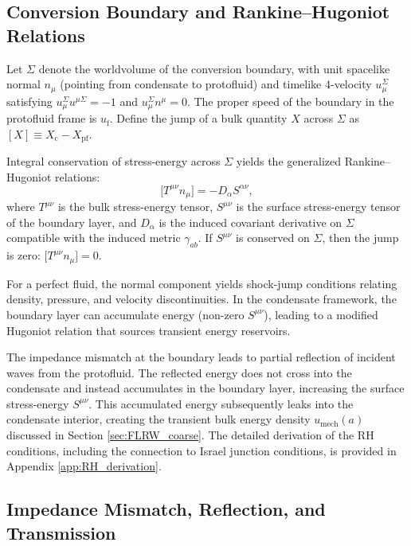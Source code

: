 \documentclass[11pt,a4paper]{article}
\newcommand{\umech}{u_{\mathrm{mech}}}
\newcommand{\uf}{u_{\mathrm{f}}}
\theoremstyle{definition}
\begin{document}
\subsection{Conversion Boundary and Rankine--Hugoniot Relations}
\label{sec:RH}

Let $\Sigma$ denote the worldvolume of the conversion boundary, with unit spacelike normal $n_\mu$ (pointing from condensate to protofluid) and timelike 4-velocity $u_\mu^{\Sigma}$ satisfying $u_\mu^{\Sigma} u^{\mu \Sigma} = -1$ and $u_\mu^{\Sigma} n^\mu = 0$. The proper speed of the boundary in the protofluid frame is $\uf$. Define the jump of a bulk quantity $X$ across $\Sigma$ as $[X] \equiv X_{\mathrm{c}} - X_{\mathrm{pf}}$.

Integral conservation of stress-energy across $\Sigma$ yields the generalized Rankine--Hugoniot relations:
\begin{equation}
\label{eq:RH_general}
\big[ T^{\mu\nu} n_\mu \big] = - D_\alpha S^{\alpha\nu},
\end{equation}
where $T^{\mu\nu}$ is the bulk stress-energy tensor, $S^{\mu\nu}$ is the surface stress-energy tensor of the boundary layer, and $D_\alpha$ is the induced covariant derivative on $\Sigma$ compatible with the induced metric $\gamma_{ab}$. If $S^{\mu\nu}$ is conserved on $\Sigma$, then the jump is zero: $\big[ T^{\mu\nu} n_\mu \big] = 0$.

For a perfect fluid, the normal component yields shock-jump conditions relating density, pressure, and velocity discontinuities. In the condensate framework, the boundary layer can accumulate energy (non-zero $S^{\mu\nu}$), leading to a modified Hugoniot relation that sources transient energy reservoirs.

The impedance mismatch at the boundary leads to partial reflection of incident waves from the protofluid. The reflected energy does not cross into the condensate and instead accumulates in the boundary layer, increasing the surface stress-energy $S^{\mu\nu}$. This accumulated energy subsequently leaks into the condensate interior, creating the transient bulk energy density $\umech(a)$ discussed in Section \ref{sec:FLRW_coarse}. The detailed derivation of the RH conditions, including the connection to Israel junction conditions, is provided in Appendix \ref{app:RH_derivation}.

\subsection{Impedance Mismatch, Reflection, and Transmission}
\label{sec:impedance_detail}
\end{document}
